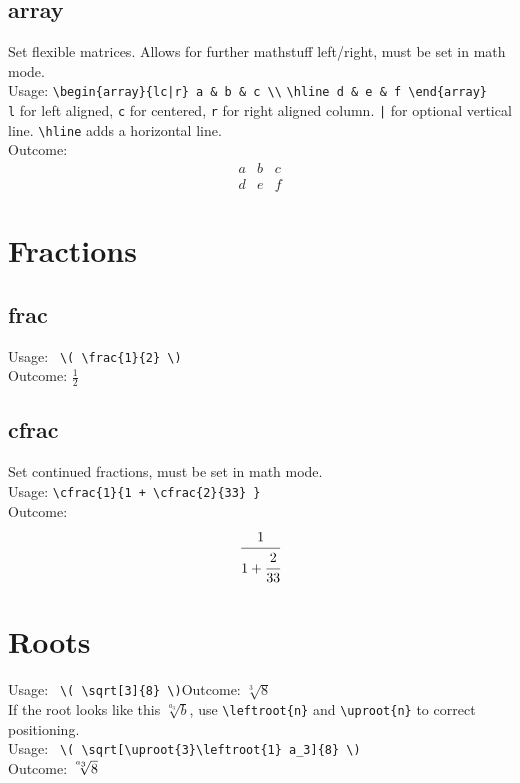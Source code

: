 \documentclass[draft]{cheatsht}
\begin{document}
\subsection{array}
Set flexible matrices. Allows for further mathstuff left/right,
must be set in math mode.\\
Usage: \verb!\begin{array}{lc|r} a & b & c \\!
\verb!\hline d & e & f \end{array}!\\
\verb!l! for left aligned, \verb!c! for centered,
\verb!r! for right aligned column.
\verb!|! for optional vertical line. \verb!\hline! adds a horizontal line.\\
Outcome:
\begin{displaymath}
  \begin{array}{lc|r} a & b & c \\ \hline d & e & f \end{array}
\end{displaymath}

\section{Fractions}
\subsection{frac}
Usage: \verb! \( \frac{1}{2} \)!\\
Outcome: \(\frac{1}{2}\)

\subsection{cfrac}
Set continued fractions, must be set in math mode.\\
Usage: \verb!\cfrac{1}{1 + \cfrac{2}{33} }!\\
Outcome: \begin{displaymath}
  \cfrac{1}{1 + \cfrac{2}{33} }
\end{displaymath}

\section{Roots}
Usage: \verb! \( \sqrt[3]{8} \)!\hspace{1.5cm}Outcome: \(\sqrt[3]{8}\)\\
If the root looks like this \(\sqrt[a_3]{b}\), use \verb!\leftroot{n}! and
\verb!\uproot{n}! to correct positioning.\\
Usage: \verb! \( \sqrt[\uproot{3}\leftroot{1} a_3]{8} \)! \\
Outcome: \(\sqrt[\uproot{3}\leftroot{1} a_3]{8}\)
\end{document}
